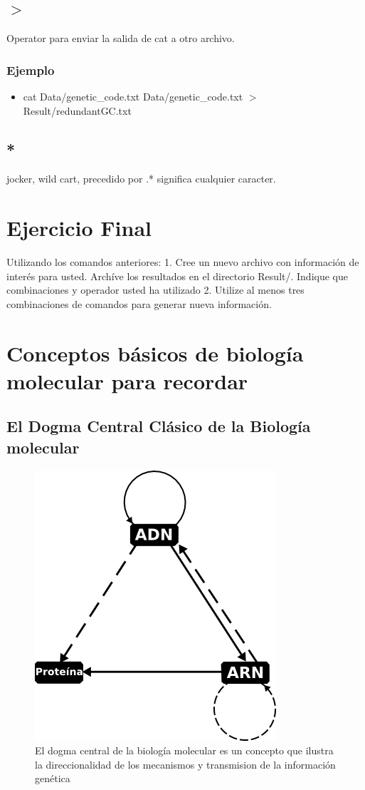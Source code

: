 \documentclass[10pt]{article}
\begin{document}
\subsection{$>$}
Operator para enviar la salida de cat a otro archivo.
\subsubsection{Ejemplo}
\begin{itemize}
\item cat Data/genetic\_code.txt Data/genetic\_code.txt $>$ Result/redundantGC.txt
\end{itemize}

\subsection{*}

jocker, wild cart, precedido por .* significa cualquier caracter.

\section{Ejercicio Final}

Utilizando los comandos anteriores:
1. Cree un nuevo archivo con información de interés para usted. Archíve los resultados  en el directorio Result/. Indique que combinaciones y operador usted ha utilizado
2. Utilize al menos tres combinaciones de comandos para generar nueva información.

\newpage
\section{Conceptos básicos de biología molecular para recordar}

\subsection{El Dogma Central Clásico de la Biología molecular}
\begin{figure}[htb!]
\includegraphics[scale=0.5]{./figures/dogma.jpg}
\caption{El dogma central de la biología molecular es un concepto que ilustra
la direccionalidad de los mecanismos y transmision de la información genética}
\end{figure}
\end{document}
